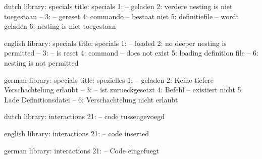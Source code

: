 


\unprotect

\startmessages  dutch  library: specials
  title: specials
      1: -- geladen
      2: verdere nesting is niet toegestaan --
      3: -- gereset
      4: commando -- bestaat niet
      5: definitiefile -- wordt geladen
      6: nesting is niet toegestaan
\stopmessages

\startmessages  english  library: specials
  title: specials
      1: -- loaded
      2: no deeper nesting is permitted --
      3: -- is reset
      4: command -- does not exist
      5: loading definition file --
      6: nesting is not permitted
\stopmessages

\startmessages  german  library: specials
  title: spezielles
      1: -- geladen
      2: Keine tiefere Verschachtelung erlaubt --
      3: -- ist zurueckgesetzt
      4: Befehl -- existiert nicht
      5: Lade Definitionsdatei --
      6: Verschachtelung nicht erlaubt
\stopmessages

\startmessages  dutch  library: interactions
     21: -- code tussengevoegd
\stopmessages

\startmessages  english  library: interactions
     21: -- code inserted
\stopmessages

\startmessages  german  library: interactions
     21: -- Code eingefuegt
\stopmessages

